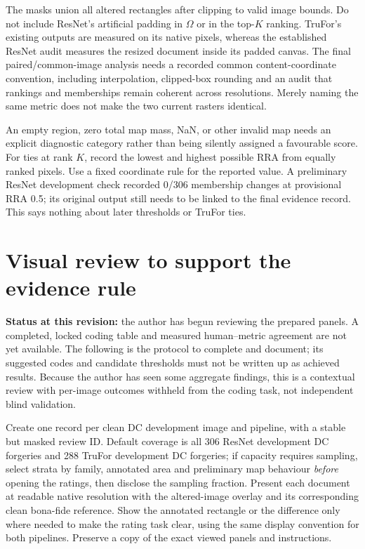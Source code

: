 The masks union all altered rectangles after clipping to valid image bounds. Do not include ResNet's artificial padding in $\Omega$ or in the top-$K$ ranking. TruFor's existing outputs are measured on its native pixels, whereas the established ResNet audit measures the resized document inside its padded canvas. The final paired/common-image analysis needs a recorded common content-coordinate convention, including interpolation, clipped-box rounding and an audit that rankings and memberships remain coherent across resolutions. Merely naming the same metric does not make the two current rasters identical.

An empty region, zero total map mass, NaN, or other invalid map needs an explicit diagnostic category rather than being silently assigned a favourable score. For ties at rank $K$, record the lowest and highest possible RRA from equally ranked pixels. Use a fixed coordinate rule for the reported value. A preliminary ResNet development check recorded 0/306 membership changes at provisional RRA 0.5; its original output still needs to be linked to the final evidence record. This says nothing about later thresholds or TruFor ties.

\section{Visual review to support the evidence rule}
\label{app:clean-metrics-human}

\textbf{Status at this revision:} the author has begun reviewing the prepared panels. A completed, locked coding table and measured human--metric agreement are not yet available. The following is the protocol to complete and document; its suggested codes and candidate thresholds must not be written up as achieved results. Because the author has seen some aggregate findings, this is a contextual review with per-image outcomes withheld from the coding task, not independent blind validation.

Create one record per clean DC development image and pipeline, with a stable but masked review ID. Default coverage is all 306 ResNet development DC forgeries and 288 TruFor development DC forgeries; if capacity requires sampling, select strata by family, annotated area and preliminary map behaviour \emph{before} opening the ratings, then disclose the sampling fraction. Present each document at readable native resolution with the altered-image overlay and its corresponding clean bona-fide reference. Show the annotated rectangle or the difference only where needed to make the rating task clear, using the same display convention for both pipelines. Preserve a copy of the exact viewed panels and instructions.


